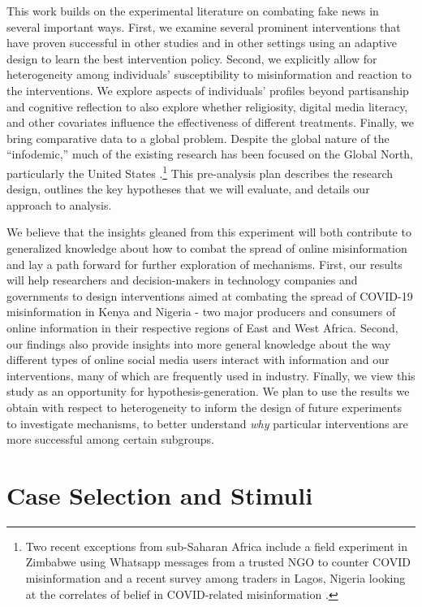 \documentclass[letterpaper, 12pt, parskip=full,DIV=10]{scrartcl}
\begin{document}
This work builds on the experimental literature on combating fake news in several important ways. First, we examine several prominent interventions that have proven successful in other studies and in other settings using an adaptive design to learn the best intervention policy. Second, we explicitly allow for heterogeneity among individuals' susceptibility to misinformation and reaction to the interventions. We explore aspects of individuals' profiles beyond partisanship and cognitive reflection to also explore whether religiosity, digital media literacy, and other covariates influence the effectiveness of different treatments. Finally, we bring comparative data to a global problem. Despite the global nature of the ``infodemic,'' much of the existing research has been focused on the Global North, particularly the United States \citep{pennycook2020fighting, bursztyn2020misinformation}.\footnote{Two recent exceptions from sub-Saharan Africa include a field experiment in Zimbabwe using Whatsapp messages from a trusted NGO  to counter COVID misinformation \citep{bowles2020center} and a recent survey among traders in Lagos, Nigeria looking at the correlates of belief in COVID-related misinformation \citep{Grossman2020}.} This pre-analysis plan describes the research design, outlines the key hypotheses that we will evaluate, and details our approach to analysis.

We believe that the insights gleaned from this experiment will both contribute to generalized knowledge about how to combat the spread of online misinformation and lay a path forward for further exploration of mechanisms. First, our results will help researchers and decision-makers in technology companies and governments to design interventions aimed at combating the spread of COVID-19 misinformation in Kenya and Nigeria - two major producers and consumers of online information in their respective regions of East and West Africa. Second, our findings also provide insights into more general knowledge about the way different types of online social media users interact with information and our interventions, many of which are frequently used in industry. Finally, we view this study as an opportunity for hypothesis-generation. We plan to use the results we obtain with respect to heterogeneity to inform the design of future experiments to investigate mechanisms, to better understand \textit{why} particular interventions are more successful among certain subgroups.


\section{Case Selection and Stimuli}
\end{document}
